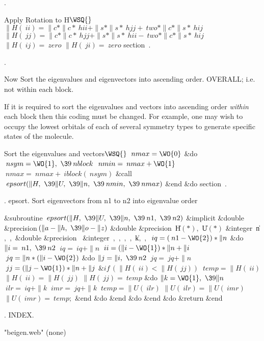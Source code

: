 .

\WY\WP\4\4Apply Rotation to H\X \X${}\WSQ{}$\7
$\|H(\>{ii})=\|c\ast\|c\ast\>{hii}+\|s\ast\|s\ast\>{hjj}+\>{two}\ast\|c\ast\|s%
\ast\>{hij}$\6
$\|H(\>{jj})=\|c\ast\|c\ast\>{hjj}+\|s\ast\|s\ast\>{hii}-\>{two}\ast\|c\ast\|s%
\ast\>{hij}$\6
$\|H(\>{ij})=\>{zero}$\6
$\|H(\>{ji})=\>{zero}$\7
\Wendc
\WU section~.
\fi %

.

Now Sort the eigenvalues and eigenvectors into ascending order.
OVERALL; i.e. not within each block.

If it is required to sort the eigenvalues and vectors into
ascending order {\em within\/} each block then this coding must be
changed. For example, one may wish to occupy the lowest orbitals
of each of several symmetry types to generate specific states of the
molecule.

\WY\WP\4\4Sort the eigenvalues and vectors\X \X${}\WSQ{}$\7
$\>{nmax}=\WO{0}$\6
\&{do} $\>{nsym}=\WO{1},\ \39\>{nblock}$\1\7
$\>{nmin}=\>{nmax}+\WO{1}$\6
$\>{nmax}=\>{nmax}+\>{iblock}(\>{nsym})$\6
\&{call} $\>{epsort}(\|H,\ \39\|U,\ \39\|n,\ \39\>{nmin},\ \39\>{nmax})$\2\7
\&{end} \&{do}\WY\Wendc
\WU section~.
\fi %

.  epsort.   Sort eigenvectors from n1 to n2 into eigenvalue order

\WY\WP {}%
\&{subroutine} \1$\>{epsort}(\|H,\ \39\|U,\ %
\39\|n,\ \39\>{n1},\ \39\>{n2})$\2\1\6
\&{implicit} \1\&{double} \&{precision}$\,(\|a-\|h,\ \39\|o-\|z)$\2\6
\&{double} \&{precision}~\1\|H$(\ast),$ \|U$(\ast)$\2\6
\&{integer}~\1\|n$,$ $,$ \2\7
\&{double} \&{precision}~\1\2\6
\&{integer}~\1$,$ $,$ $,$ $,$ \|k$,$ $,$ %
\2\7
$\>{iq}=(\>{n1}-\WO{2})\ast\|n$\6
\&{do} $\|i=\>{n1},\ \39\>{n2}$\1\6
$\>{iq}=\>{iq}+\|n$\6
$\>{ii}=(\|i-\WO{1})\ast\|n+\|i$\6
$\>{jq}=\|n\ast(\|i-\WO{2})$\6
\&{do} $\|j=\|i,\ \39\>{n2}$\1\6
$\>{jq}=\>{jq}+\|n$\6
$\>{jj}=(\|j-\WO{1})\ast\|n+\|j$\6
$\&{if}\,(\|H(\>{ii})<\|H(\>{jj}))$\1\6
\2\5
\6
$\>{temp}=\|H(\>{ii})$\6
$\|H(\>{ii})=\|H(\>{jj})$\6
$\|H(\>{jj})=\>{temp}$\6
\&{do} $\|k=\WO{1},\ \39\|n$\1\6
$\>{ilr}=\>{iq}+\|k$\6
$\>{imr}=\>{jq}+\|k$\6
$\>{temp}=\|U(\>{ilr})$\6
$\|U(\>{ilr})=\|U(\>{imr})$\6
$\|U(\>{imr})=\>{temp};$\2\6
\&{end} \&{do}\2\6
\&{end} \&{do}\2\6
\&{end} \&{do}\6
\&{return}\2\6
\&{end}\WY\Wendc
\fi %

.  INDEX.
\fi %




  {"beigen.web"} {(none)}
 {\Fortran}


\FWEBend
